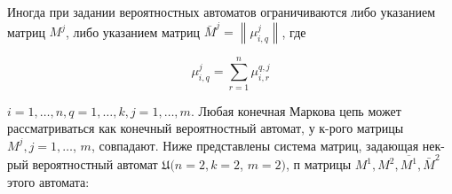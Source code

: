 \documentclass[10pt]{article}
\begin{document}
Иногда при задании вероятностных автоматов ограничиваются либо указанием матриц $M^{j}$, либо указанием матриц $\bar{M}^{j}=\left\|\mu_{i, q}^{j}\right\|$, где



\[

\mu_{i, q}^{j}=\sum_{r=1}^{n} \mu_{i, r}^{q, j}

\]



$i=1, \ldots, n, q=1, \ldots, k, j=1, \ldots, m$. Любая конечная Маркова цепь может рассматриваться как конечный вероятностный автомат, у к-рого матрицы $M^{j}, j=1, \ldots$, $m$, совпадают. Ниже представлены система матриц, задающая нек-рый вероятностный автомат $\mathfrak{U}(n=2, k=2$, $m=2)$, п матрицы $M^{1}, M^{2}, \overline{M^{1}}, \bar{M}^{2}$ этого автомата:
\end{document}
